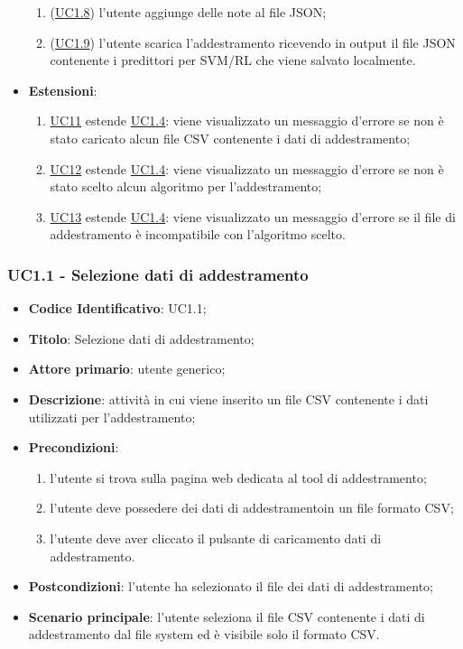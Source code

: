\begin{itemize}
\begin{enumerate}
					\item (\hyperref[par:UC1.8]{UC1.8}) l'utente aggiunge delle note al file JSON;					
					\item (\hyperref[par:UC1.9]{UC1.9}) l'utente scarica l'addestramento ricevendo in output il file JSON contenente i predittori per SVM/RL che viene salvato localmente.
				\end{enumerate}
			\item\textbf{Estensioni}: 
				\begin{enumerate}
					\item \hyperref[par:UC11]{UC11} estende \hyperref[par:UC1.4]{UC1.4}: viene visualizzato un messaggio d'errore se non è stato caricato alcun file CSV contenente i dati di addestramento;
					\item \hyperref[par:UC12]{UC12} estende \hyperref[par:UC1.4]{UC1.4}: viene visualizzato un messaggio d'errore se non è stato scelto alcun algoritmo per l'addestramento;
					\item \hyperref[par:UC13]{UC13} estende \hyperref[par:UC1.4]{UC1.4}: viene visualizzato un messaggio d'errore se il file di addestramento è incompatibile con l'algoritmo scelto.
				\end{enumerate}
			
		\end{itemize}
		
		\label{par:UC1.1}
		\subsubsection{UC1.1 - Selezione dati di addestramento }
		\begin{itemize}
			\item\textbf{Codice Identificativo}: UC1.1;
			\item\textbf{Titolo}: Selezione dati di addestramento;
			\item\textbf{Attore primario}: utente generico;
			\item\textbf{Descrizione}: attività in cui viene inserito un file CSV contenente i dati utilizzati per l'addestramento;
			\item\textbf{Precondizioni}:
				\begin{enumerate}
					\item l'utente si trova sulla pagina web dedicata al tool di addestramento;
					\item l'utente deve possedere dei dati di addestramento\glo in un file formato CSV\glo;
					\item l'utente deve aver cliccato il pulsante di caricamento dati di addestramento.
				\end{enumerate}
			\item\textbf{Postcondizioni}: l'utente ha selezionato il file dei dati di addestramento;
			\item\textbf{Scenario principale}: l'utente seleziona il file CSV contenente i dati di addestramento dal file system ed è visibile solo il formato CSV.
		\end{itemize}
		
